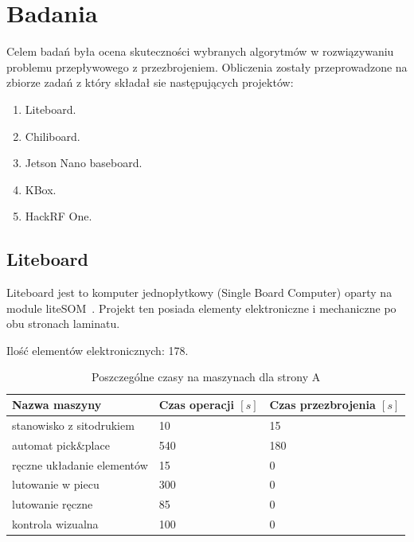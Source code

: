 \chapter{Badania}

Celem badań była ocena skuteczności wybranych algorytmów w rozwiązywaniu problemu przepływowego z przezbrojeniem. Obliczenia zostały przeprowadzone na zbiorze zadań z który składał sie następujących projektów:
\begin{enumerate}
	\item Liteboard.
	\item Chiliboard.
	\item Jetson Nano baseboard.
	\item KBox.
	\item HackRF One.
\end{enumerate}

\section{Liteboard}

Liteboard jest to komputer jednopłytkowy (Single Board Computer) oparty na module liteSOM~\cite{liteboard}. Projekt ten posiada elementy elektroniczne i mechaniczne po obu stronach laminatu.

\breakparagraph{}
Ilość elementów elektronicznych: 178.

\begin{table}[H]
	\centering
	\caption{Poszczególne czasy na maszynach dla strony A}
	\begin{tabular}{lll}
		\toprule
		Nazwa maszyny                 & Czas operacji $[s]$ & Czas przezbrojenia $[s]$ \\
		\midrule
		stanowisko z sitodrukiem      & 10                  & 15                       \\
		automat pick\&place           & 540                 & 180                      \\
		ręczne układanie elementów & 15                  & 0                        \\
		lutowanie w piecu             & 300                 & 0                        \\
		lutowanie ręczne             & 85                  & 0                        \\
		kontrola wizualna             & 100                 & 0                        \\
		\bottomrule
	\end{tabular}
\end{table}

